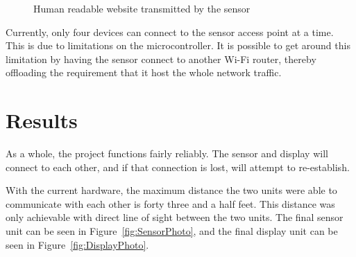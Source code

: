 \documentclass[onecolumn, 12pt]{IEEEConf}
\begin{document}
        \begin{figure}
            \centering
            \caption{\label{fig:Website}Human readable website transmitted by the sensor}
        \end{figure}

        Currently, only four devices can connect to the sensor access point at a time.
        This is due to limitations on the microcontroller.
        It is possible to get around this limitation by having the sensor connect to
        another Wi-Fi router, thereby offloading the requirement that it host the whole network traffic.

    \section{Results}
        As a whole, the project functions fairly reliably.
        The sensor and display will connect to each other, and if that connection is lost, will attempt to re-establish.

        With the current hardware, the maximum distance the two units were able to communicate with each other is forty three and a half feet.
        This distance was only achievable with direct line of sight between the two units.
        The final sensor unit can be seen in Figure~\ref{fig:SensorPhoto}, and the final display unit can be seen in Figure~\ref{fig:DisplayPhoto}.
        
\end{document}
